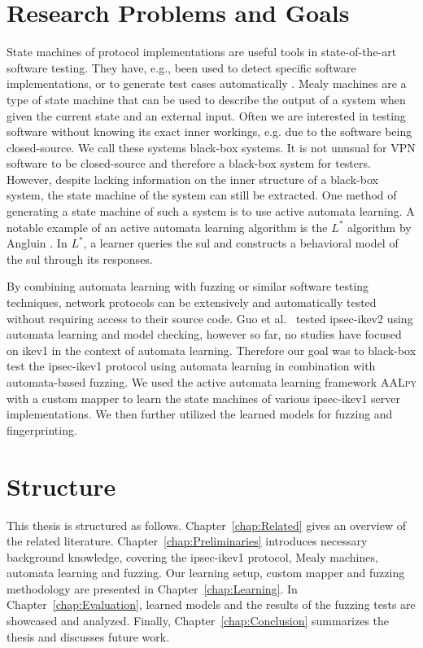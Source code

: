 \section{Research Problems and Goals}
State machines of protocol implementations are useful tools in state-of-the-art software testing. They have, e.g., been used to detect specific software implementations, or to generate test cases automatically \cite{pferscher2021fingerprinting, pferscher2022fuzzing}. Mealy machines are a type of state machine that can be used to describe the output of a system when given the current state and an external input. Often we are interested in testing software without knowing its exact inner workings, e.g. due to the software being closed-source. We call these systems black-box systems. It is not unusual for VPN software to be closed-source and therefore a black-box system for testers. However, despite lacking information on the inner structure of a black-box system, the state machine of the system can still be extracted. One method of generating a state machine of such a system is to use active automata learning. A notable example of an active automata learning algorithm is the $L^*$ algorithm by Angluin \cite{angluin1987learning}. In $L^*$, a learner queries the \ac{sul} and constructs a behavioral model of the \ac{sul} through its responses. 

By combining automata learning with fuzzing or similar software testing techniques, network protocols can be extensively and automatically tested without requiring access to their source code. Guo et al.~\cite{guo2019model} tested \ac{ipsec}-\ac{ike}v2 using automata learning and model checking, however so far, no studies have focused on \ac{ike}v1 in the context of automata learning. Therefore our goal was to black-box test the \ac{ipsec}-\ac{ike}v1 protocol using automata learning in combination with automata-based fuzzing. We used the active automata learning framework \textsc{AALpy} \cite{muvskardin2022aalpy} with a custom mapper to learn the state machines of various \ac{ipsec}-\ac{ike}v1 server implementations. We then further utilized the learned models for fuzzing and fingerprinting. %

\section{Structure}
This thesis is structured as follows. Chapter~\ref{chap:Related} gives an overview of the related literature. Chapter~\ref{chap:Preliminaries} introduces necessary background knowledge, covering the \ac{ipsec}-\ac{ike}v1 protocol, Mealy machines, automata learning and fuzzing. Our learning setup, custom mapper and fuzzing methodology are presented in Chapter~\ref{chap:Learning}. In Chapter~\ref{chap:Evaluation}, learned models and the results of the fuzzing tests are showcased and analyzed.
Finally, Chapter~\ref{chap:Conclusion} summarizes the thesis and discusses future work.